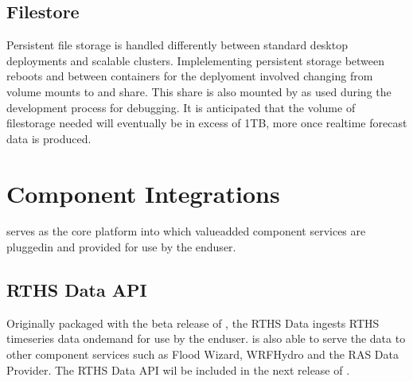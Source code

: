 \documentclass[letterpaper,12pt,english,openany,oneside]{sphinxmanual}
\begin{document}
\subsection{Filestore}
\label{\detokenize{euidev/infrastructure/index:filestore}}
\sphinxAtStartPar
Persistent file storage is handled differently between standard {\hyperref[\detokenize{_static/glossary:term-Docker}]{}} desktop deployments and scalable {\hyperref[\detokenize{_static/glossary:term-K8s}]{}} clusters. Implelementing persistent storage between reboots and between containers for the {\hyperref[\detokenize{_static/glossary:term-K8s}]{}} deplyoment involved changing from volume mounts to and {\hyperref[\detokenize{_static/glossary:term-NFS}]{}} share. This {\hyperref[\detokenize{_static/glossary:term-NFS}]{}} share is also mounted by as {\hyperref[\detokenize{_static/glossary:term-GCE}]{}} {\hyperref[\detokenize{_static/glossary:term-VM}]{}} used during the development process for debugging. It is anticipated that the volume of filestorage needed will eventually be in excess of 1TB, more once real\sphinxhyphen{}time forecast data is produced.

\sphinxstepscope


\section{Component Integrations}
\label{\detokenize{euidev/integrations/index:component-integrations}}\label{\detokenize{euidev/integrations/index::doc}}
\sphinxAtStartPar
{\hyperref[\detokenize{_static/glossary:term-RGVFlood}]{}} serves as the core platform into which value\sphinxhyphen{}added component services are plugged\sphinxhyphen{}in and provided for use by the end\sphinxhyphen{}user.


\subsection{RTHS Data API}
\label{\detokenize{euidev/integrations/index:rths-data-api}}
\sphinxAtStartPar
Originally packaged with the beta release of {\hyperref[\detokenize{_static/glossary:term-RGVFlood}]{}}, the RTHS Data {\hyperref[\detokenize{_static/glossary:term-API}]{}} ingests RTHS time\sphinxhyphen{}series data on\sphinxhyphen{}demand for use by the end\sphinxhyphen{}user. {\hyperref[\detokenize{_static/glossary:term-RGVFlood}]{}} is also able to serve the data to other component services such as Flood Wizard, WRF\sphinxhyphen{}Hydro and the RAS Data Provider. The  RTHS Data API wil be included in the next release of {\hyperref[\detokenize{_static/glossary:term-RGVFlood.com}]{}}.
\end{document}
